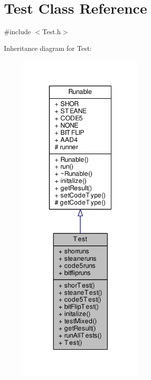 \hypertarget{class_test}{}\section{Test Class Reference}
\label{class_test}


{\ttfamily \#include $<$Test.\+h$>$}



Inheritance diagram for Test\+:\nopagebreak
\begin{figure}[H]
\begin{center}
\leavevmode
\includegraphics[width=175pt]{class_test__inherit__graph}
\end{center}
\end{figure}
